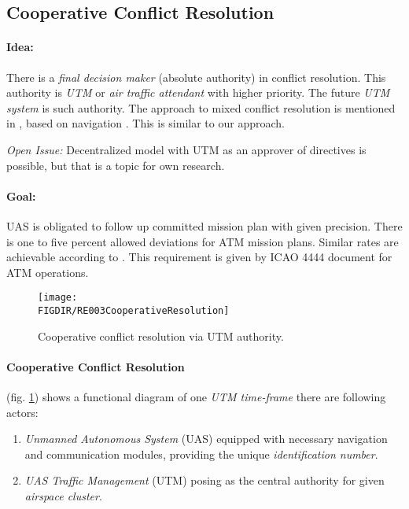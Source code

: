 \subsection{Cooperative Conflict Resolution}\label{sec:cooperativeConflictResolution}


\paragraph{Idea:} There is a \emph{final decision maker} (absolute authority) in conflict resolution. This authority is \emph{UTM} or \emph{air traffic attendant} with higher priority. The future \emph{UTM system} is such authority. The approach to mixed conflict resolution is mentioned in \cite{ramasamy2014towards}, based on navigation \cite{ramasamy2013novel}. This is similar to our approach. 

\begin{note}
    \emph{Open Issue:} Decentralized model with UTM as an approver of directives is possible, but that is a topic for own research.
\end{note}

\paragraph{Goal:} UAS is obligated to follow up committed mission plan with given precision.  There is one to five percent  allowed deviations for ATM mission plans.     Similar rates are achievable according to \cite{ramasamy2014towards}.  This requirement is given by \cite{icao4444} ICAO 4444 document for ATM operations.

\begin{figure}[H]
    \centering
    \texttt{[image: \\FIGDIR/RE003CooperativeResolution]} 
    \caption{Cooperative conflict resolution via UTM authority.}
    \label{fig:CooperativeConflictResolutionUTM}
\end{figure}

\paragraph{Cooperative Conflict Resolution} (fig. \ref{fig:CooperativeConflictResolutionUTM}) shows a functional diagram of one \emph{UTM time-frame} there  are following actors:
\begin{enumerate}
    \item \emph{Unmanned Autonomous System} (UAS) equipped with necessary navigation and communication modules, providing the unique \emph{identification number}.
    
    \item \emph{UAS Traffic Management} (UTM) posing as the central authority for given \emph{airspace cluster}.
\end{enumerate}

